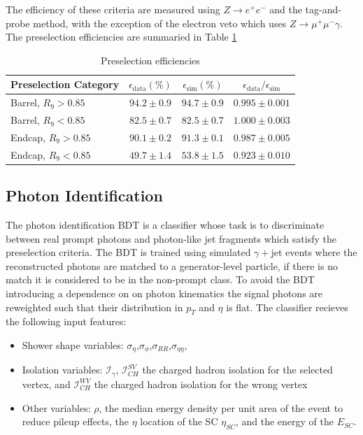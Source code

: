 The efficiency of these criteria are measured using $Z\rightarrow{}e^{+}e^{-}$ and the tag-and-probe method, 
with the exception of the electron veto which uses $Z\rightarrow{}\mu^{+}\mu^{-}\gamma$. The preselection efficiencies are summaried in Table \ref{tab:object_reco:presel_eff}
\begin{table}[h!]
    \begin{tabular}{ l | c | c | c }
        Preselection Category& $\epsilon_{\mathrm{data}} (\%)$ & $\epsilon_{\mathrm{sim}} (\%)$ & $\epsilon_{\mathrm{data}}/\epsilon_{\mathrm{sim}}$ \\
        \hline
        Barrel, $R_{9}>0.85$ & $94.2\pm0.9$ & $94.7\pm0.9$ & $0.995\pm0.001$ \\
        Barrel, $R_{9}<0.85$ & $82.5\pm0.7$ & $82.5\pm0.7$ & $1.000\pm0.003$ \\ 
        \hline
        Endcap, $R_{9}>0.85$ & $90.1\pm0.2$ & $91.3\pm0.1$ & $0.987\pm0.005$ \\ 
        Endcap, $R_{9}<0.85$ & $49.7\pm1.4$ & $53.8\pm1.5$ & $0.923\pm0.010$ \\ 
\end{tabular}
    \caption{Preselection efficiencies}
    \label{tab:object_reco:presel_eff}
\end{table}





\subsection{Photon Identification}
The photon identification BDT is a classifier whose task is to discriminate between real prompt photons and photon-like jet fragments which satisfy the preselection criteria. 
The BDT is trained using simulated $\gamma + $jet events where the reconstructed photons are matched to a generator-level particle, if there is no match it is considered to be in the non-prompt class.
To avoid the BDT introducing a dependence on on photon kinematics the signal photons are reweighted such that their distribution in $p_{T}$ and $\eta$ is flat. 
The classifier recieves the following input features:
\begin{itemize}[leftmargin=.5in,noitemsep]
    \item Shower shape variables: $\sigma_{\eta}$,$\sigma_{\phi}$,$\sigma_{RR}$,$\sigma_{\eta\eta}$,
    \item Isolation variables: $\mathcal{I}_{\gamma}$, $\mathcal{I}_{CH}^{SV}$ the charged hadron isolation for the selected vertex, and $\mathcal{I}_{CH}^{WV}$ the charged hadron isolation for the wrong vertex 
    \item Other variables: $\rho$, the median energy density per unit area of the event to reduce pileup effects, the $\eta$ location of the SC $\eta_{SC}$, and the energy of the $E_{SC}$. 
\end{itemize}

